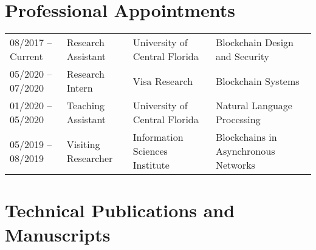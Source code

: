 \documentclass[10pt]{article}
\begin{document}
\section*{\sc Professional Appointments}

\begin{tabular}{llll}
     08/2017 -- Current & Research Assistant &  University of Central Florida & Blockchain Design and Security \\
    05/2020 -- 07/2020 & Research Intern &  Visa Research & Blockchain Systems \\
    01/2020 -- 05/2020 & Teaching Assistant &  University of Central Florida & Natural Language Processing \\
    05/2019 -- 08/2019 & Visiting Researcher &  Information Sciences Institute & Blockchains in Asynchronous Networks \\
     
\end{tabular}


\section*{\sc Technical Publications and Manuscripts}\label{publications}
\end{document}
